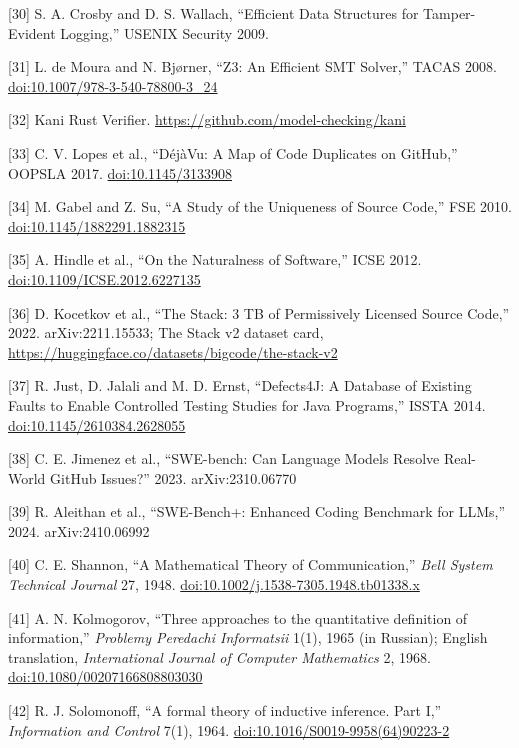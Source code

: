 \documentclass[10pt,letterpaper]{article}
\begin{document}
{[}30{]} S. A. Crosby and D. S. Wallach, ``Efficient Data Structures for
Tamper-Evident Logging,'' USENIX Security 2009.

{[}31{]} L. de Moura and N. Bjørner, ``Z3: An Efficient SMT Solver,''
TACAS 2008.
\href{https://doi.org/10.1007/978-3-540-78800-3_24}{doi:10.1007/978-3-540-78800-3\_24}

{[}32{]} Kani Rust Verifier.
\url{https://github.com/model-checking/kani}

{[}33{]} C. V. Lopes et al., ``DéjàVu: A Map of Code Duplicates on
GitHub,'' OOPSLA 2017.
\href{https://doi.org/10.1145/3133908}{doi:10.1145/3133908}

{[}34{]} M. Gabel and Z. Su, ``A Study of the Uniqueness of Source
Code,'' FSE 2010.
\href{https://doi.org/10.1145/1882291.1882315}{doi:10.1145/1882291.1882315}

{[}35{]} A. Hindle et al., ``On the Naturalness of Software,'' ICSE
2012.
\href{https://doi.org/10.1109/ICSE.2012.6227135}{doi:10.1109/ICSE.2012.6227135}

{[}36{]} D. Kocetkov et al., ``The Stack: 3 TB of Permissively Licensed
Source Code,'' 2022. arXiv:2211.15533; The Stack v2 dataset card,
\url{https://huggingface.co/datasets/bigcode/the-stack-v2}

{[}37{]} R. Just, D. Jalali and M. D. Ernst, ``Defects4J: A Database of
Existing Faults to Enable Controlled Testing Studies for Java
Programs,'' ISSTA 2014.
\href{https://doi.org/10.1145/2610384.2628055}{doi:10.1145/2610384.2628055}

{[}38{]} C. E. Jimenez et al., ``SWE-bench: Can Language Models Resolve
Real-World GitHub Issues?'' 2023. arXiv:2310.06770

{[}39{]} R. Aleithan et al., ``SWE-Bench+: Enhanced Coding Benchmark for
LLMs,'' 2024. arXiv:2410.06992

{[}40{]} C. E. Shannon, ``A Mathematical Theory of Communication,''
\emph{Bell System Technical Journal} 27, 1948.
\href{https://doi.org/10.1002/j.1538-7305.1948.tb01338.x}{doi:10.1002/j.1538-7305.1948.tb01338.x}

{[}41{]} A. N. Kolmogorov, ``Three approaches to the quantitative
definition of information,'' \emph{Problemy Peredachi Informatsii} 1(1),
1965 (in Russian); English translation, \emph{International Journal of
Computer Mathematics} 2, 1968.
\href{https://doi.org/10.1080/00207166808803030}{doi:10.1080/00207166808803030}

{[}42{]} R. J. Solomonoff, ``A formal theory of inductive inference.
Part I,'' \emph{Information and Control} 7(1), 1964.
\href{https://doi.org/10.1016/S0019-9958(64)90223-2}{doi:10.1016/S0019-9958(64)90223-2}
\end{document}
